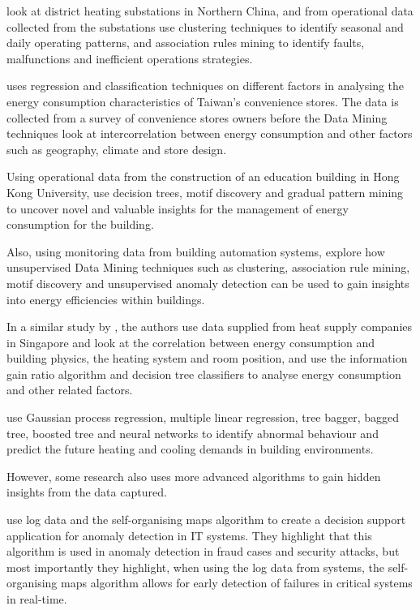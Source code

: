 \documentclass[12pt]{scrartcl}
\begin{document}
\citet{XUE2017926} look at district heating substations in Northern China, and from operational data collected from the substations use clustering techniques to identify seasonal and daily operating patterns, and association rules mining to identify faults, malfunctions and inefficient operations strategies. 

\citet{JEFFREYKUO2018120} uses regression and classification techniques on different factors in analysing the energy consumption characteristics of Taiwan’s convenience stores. The data is collected from a survey of convenience stores owners before the Data Mining techniques look at intercorrelation between energy consumption and other factors such as geography, climate and store design. 

Using operational data from the construction of an education building in Hong Kong University, \citet{FAN2018296} use decision trees, motif discovery and gradual pattern mining to uncover novel and valuable insights for the management of energy consumption for the building.

Also, using monitoring data from building automation systems, \citet{FAN2018296} explore how unsupervised Data Mining techniques such as clustering, association rule mining, motif discovery and unsupervised anomaly detection can be used to gain insights into energy efficiencies within buildings. 

In a similar study by \citet{ZHOU201873}, the authors use data supplied from heat supply companies in Singapore and look at the correlation between energy consumption and building physics, the heating system and room position, and use the information gain ratio algorithm and decision tree classifiers to analyse energy consumption and other related factors. 

\citet{AHMAD2018460} use Gaussian process regression, multiple linear regression, tree bagger, bagged tree, boosted tree and neural networks to identify abnormal behaviour and predict the future heating and cooling demands in building environments. 

However, some research also uses more advanced algorithms to gain hidden insights from the data captured. 

\citet{13090171620180801} use log data and the self-organising maps algorithm to create a decision support application for anomaly detection in IT systems. They highlight that this algorithm is used in anomaly detection in fraud cases and security attacks, but most importantly they highlight, when using the log data from systems, the self-organising maps algorithm allows for early detection of failures in critical systems in real-time. 
\end{document}
